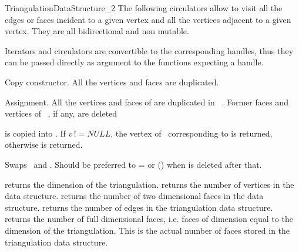 \begin{ccRefConcept}{TriangulationDataStructure_2}
The following circulators allow to visit all the edges or faces
incident to a given vertex and all the vertices
adjacent to a given vertex.  They are all bidirectional and non
mutable.

\ccGlue
{}
\ccGlue
{}
 
Iterators and circulators are convertible to the corresponding handles, thus
they can be passed directly as argument
to the functions expecting a handle.




\ccCreation
{}  %
\ccThreeToTwo


{Copy constructor. All the vertices and faces are duplicated.}

{Assignment. All the vertices and faces of  are duplicated
in \ccVar\ . Former faces and vertices of \ccVar\ , if any, are
deleted}


{ is copied into \ccVar. If $v\, !\!= NULL$, the vertex of \ccVar\ 
corresponding to  is returned, otherwise  
is returned.
}

{Swaps \ccVar\ and . Should be preferred to \ccVar= or \ccVar(\ccc{tds1})
when \ccc{tds1} is deleted after that.}

\ccAccessFunctions
{}
{returns the dimension of the triangulation.}
\ccGlue
{}
{returns the number of vertices in the data structure.}
\ccGlue
{}
{returns the number of two dimensional faces in the data structure.}
\ccGlue
{}
{returns the number of edges  in the triangulation data structure.}
\ccGlue
{}
{returns the  number of full dimensional faces, 
i.e. faces of dimension equal to the dimension
of the triangulation. This is the actual
number of faces stored in the triangulation data structure.}


\end{ccRefConcept}
